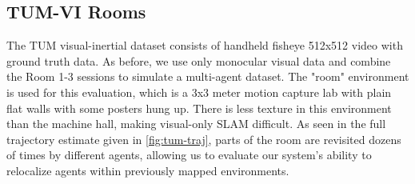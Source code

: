 


\subsection{TUM-VI Rooms}
\label{sec:tum-rooms}
The TUM visual-inertial dataset \autocite{8593419} consists of handheld fisheye 512x512 video with ground truth data. As before, we use only monocular visual data and combine the Room 1-3 sessions to simulate a multi-agent dataset. The "room" environment is used for this evaluation, which is a 3x3 meter motion capture lab with plain flat walls with some posters hung up. There is less texture in this environment than the machine hall, making visual-only SLAM difficult. As seen in the full trajectory estimate given in \autoref{fig:tum-traj}, parts of the room are revisited dozens of times by different agents, allowing us to evaluate our system's ability to relocalize agents within previously mapped environments.

